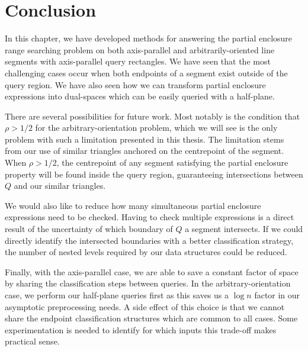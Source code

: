 \section{Conclusion}
\label{:rectangles:concl}

In this chapter, we have developed methods for answering the partial enclosure range searching problem on both axis-parallel and arbitrarily-oriented line segments with axis-parallel query rectangles. 
We have seen that the most challenging cases occur when both endpoints of a segment exist outside of the query region.
We have also seen how we can transform partial enclosure expressions into dual-spaces which can be easily queried with a half-plane.

There are several possibilities for future work.
Most notably is the condition that $\rho > 1/2$ for the arbitrary-orientation problem, which we will see is the only problem with such a limitation presented in this thesis.
The limitation stems from our use of similar triangles anchored on the centrepoint of the segment.
When $\rho > 1/2$, the centrepoint of any segment satisfying the partial enclosure property will be found inside the query region, guaranteeing intersections between $Q$ and our similar triangles.

We would also like to reduce how many simultaneous partial enclosure expressions need to be checked. Having to check multiple expressions is a direct result of the uncertainty of which boundary of $Q$ a segment intersects. If we could directly identify the intersected boundaries with a better classification strategy, the number of nested levels required by our data structures could be reduced.

Finally, with the axis-parallel case, we are able to save a constant factor of space by sharing the classification steps between queries. 
In the arbitrary-orientation case, we perform our half-plane queries first as this saves us a $\log{n}$ factor in our asymptotic preprocessing needs. A side effect of this choice is that we cannot share the endpoint classification structures which are common to all cases.  
Some experimentation is needed to identify for which inputs this trade-off makes practical sense.
